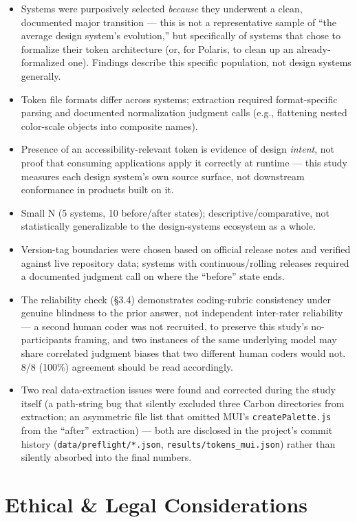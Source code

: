 \documentclass[11pt]{article}
\begin{document}
\begin{itemize}[leftmargin=1.4em]
\item Systems were purposively selected \emph{because} they underwent a clean, documented major transition --- this is not a representative sample of ``the average design system's evolution,'' but specifically of systems that chose to formalize their token architecture (or, for Polaris, to clean up an already-formalized one). Findings describe this specific population, not design systems generally.
\item Token file formats differ across systems; extraction required format-specific parsing and documented normalization judgment calls (e.g., flattening nested color-scale objects into composite names).
\item Presence of an accessibility-relevant token is evidence of design \emph{intent}, not proof that consuming applications apply it correctly at runtime --- this study measures each design system's own source surface, not downstream conformance in products built on it.
\item Small N (5 systems, 10 before/after states); descriptive/comparative, not statistically generalizable to the design-systems ecosystem as a whole.
\item Version-tag boundaries were chosen based on official release notes and verified against live repository data; systems with continuous/rolling releases required a documented judgment call on where the ``before'' state ends.
\item The reliability check (\S3.4) demonstrates coding-rubric consistency under genuine blindness to the prior answer, not independent inter-rater reliability --- a second human coder was not recruited, to preserve this study's no-participants framing, and two instances of the same underlying model may share correlated judgment biases that two different human coders would not. 8/8 (100\%) agreement should be read accordingly.
\item Two real data-extraction issues were found and corrected during the study itself (a path-string bug that silently excluded three Carbon directories from extraction; an asymmetric file list that omitted MUI's \texttt{createPalette.js} from the ``after'' extraction) --- both are disclosed in the project's commit history (\texttt{data/preflight/*.json}, \texttt{results/tokens\_mui.json}) rather than silently absorbed into the final numbers.
\end{itemize}

\section{Ethical \& Legal Considerations}
\end{document}
